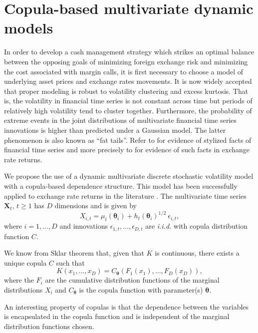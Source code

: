 \section{Copula-based multivariate dynamic models}
\label{modelling}
In order to develop a cash management strategy which strikes an optimal balance
between the opposing goals of minimizing foreign exchange risk and minimizing
the cost associated with margin calls, it is first necessary to choose a model of underlying asset prices
and exchange rates movements. It is now widely accepted that proper modeling
is robust to volatility clustering and excess kurtosis. That is, the volatility in
financial time series is not constant across time but periods of relatively high volatility
tend to cluster together. Furthermore, the probability of extreme events in the joint
distributions of multivariate financial time series innovations is higher than predicted
under a Gaussian model. The latter phenomenon is also known as ``fat tails''.
Refer to \cite{pagan96, cont01}
for evidence of stylized facts of financial time series and more precisely to
\cite{casper94, guillaume97} for evidence of such facts in exchange rate returns.

We propose the use of a dynamic multivariate discrete stochastic volatility model
with a copula-based dependence structure. This model has been successfully applied
to exchange rate returns in the literature \citep{chenfan06,Remillard11,patton06}. The
multivariate time series $\mathbf{X}_t$, $t\geq 1$ has $D$ dimensions and is given by
\begin{equation}
\label{dynmodel}
    X_{i,t}=\mu_t(\boldsymbol\theta_i)+h_t(\boldsymbol\theta_i)^{1/2} \
    \epsilon_{i,t},
\end{equation}
where $i=1,\ldots,D$
and innovations $\epsilon_{1,t},\ldots,\epsilon_{D,t}$ are \emph{i.i.d.} with
copula distribution function $C$.

We know from Sklar theorem \citep{sklar59} that, given that $K$ is continuous, there
exists a unique copula $C$ such that
\begin{equation}
\label{sklar}
     K(x_1,\ldots,x_D)=C_{\boldsymbol\theta}(F_1(x_1),\ldots,F_D(x_D)),
\end{equation}
where the $F_i$ are the cumulative distribution
functions of the marginal distributions $X_i$ and $C_{\boldsymbol\theta}$ is the copula
function with parameter(s) $\boldsymbol\theta$.

An interesting property of copulas is that the dependence between the variables is
encapsulated in the copula function and is independent of the marginal distribution
functions chosen.


